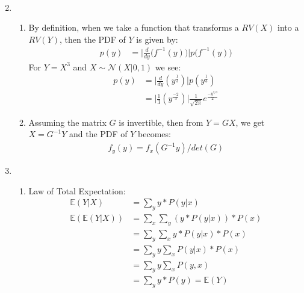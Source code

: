 \documentclass[11pt,a4paper]{article}
\begin{document}
\begin{enumerate}
\begin{enumerate}
\begin{align*}
					\end{align*}
				\end{enumerate}
			\item 
			\begin{enumerate}
				\item By definition, when we take a function that transforms a $RV(X)$ into a $RV(Y)$, then the PDF of $Y$ is given by:
				\begin{align*}
				p(y) &= \Big\vert\frac{d}{dy}\Big(f^{-1}(y)\Big)\Big\vert p\Big(f^{-1}(y)\Big)
				\end{align*}
				For $Y=X^3$ and $X \sim \mathcal{N}(X|0,1)$ we see:
				\begin{align*}
				p(y) &= \Big\vert\frac{d}{dy}(y^\frac{1}{3})\Big\vert p(y^\frac{1}{3}) \\
				&= \Big\vert \frac{1}{3} (y^{\frac{-2}{3}}) \Big\vert \frac{1}{\sqrt{2 \pi}} e^{\frac{-y^{2/3}}{2}}
				\end{align*}
				\item Assuming the matrix $G$ is invertible, then from $Y=GX$, we get $X=G^{-1}Y$ and the PDF of $Y$ becomes:
				\begin{align*}
				f_y(y) = f_x(G^{-1}y)/det(G) 
				\end{align*}
			\end{enumerate}
		
			\item 
			\begin{enumerate}
				\item Law of Total Expectation:
				\begin{align*}
				\mathbb{E}(Y|X) &= \sum_{y} y*P(y|x) \\
				\mathbb{E}( \mathbb{E} (Y|X)) &= \sum_{x} \sum_{y} (y * P(y|x)) * P(x) \\
				&= \sum_{y} \sum_{x} y * P(y|x) * P(x) \\
				&= \sum_{y} y \sum_{x} P(y|x) * P(x) \\
				&= \sum_{y} y \sum_{x} P(y,x) \\
				&= \sum_{y} y *P(y) = \mathbb{E}(Y)\\
				\end{align*}
				

\end{enumerate}
\end{enumerate}
\end{document}
